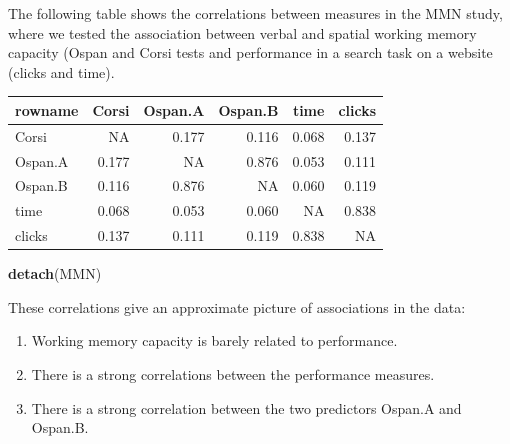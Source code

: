 \documentclass[]{svmono}
\newenvironment{Shaded}{\begin{snugshade}}{\end{snugshade}}
\newcommand{\KeywordTok}[1]{\textcolor[rgb]{0.13,0.29,0.53}{\textbf{#1}}}
\newcommand{\DecValTok}[1]{\textcolor[rgb]{0.00,0.00,0.81}{#1}}
\newcommand{\StringTok}[1]{\textcolor[rgb]{0.31,0.60,0.02}{#1}}
\newcommand{\OperatorTok}[1]{\textcolor[rgb]{0.81,0.36,0.00}{\textbf{#1}}}
\newcommand{\NormalTok}[1]{#1}
\providecommand{\tightlist}{%
  \setlength{\itemsep}{0pt}\setlength{\parskip}{0pt}}
\begin{document}
The following table shows the correlations between measures in the MMN
study, where we tested the association between verbal and spatial
working memory capacity (Ospan and Corsi tests and performance in a
search task on a website (clicks and time).

\begin{Shaded}
\end{Shaded}

\begin{tabular}{l|r|r|r|r|r}
\hline
rowname & Corsi & Ospan.A & Ospan.B & time & clicks\\
\hline
Corsi & NA & 0.177 & 0.116 & 0.068 & 0.137\\
\hline
Ospan.A & 0.177 & NA & 0.876 & 0.053 & 0.111\\
\hline
Ospan.B & 0.116 & 0.876 & NA & 0.060 & 0.119\\
\hline
time & 0.068 & 0.053 & 0.060 & NA & 0.838\\
\hline
clicks & 0.137 & 0.111 & 0.119 & 0.838 & NA\\
\hline
\end{tabular}

\begin{Shaded}
\begin{Highlighting}[]
\KeywordTok{detach}\NormalTok{(MMN)}
\end{Highlighting}
\end{Shaded}

These correlations give an approximate picture of associations in the
data:

\begin{enumerate}
\def\labelenumi{\arabic{enumi}.}
\tightlist
\item
  Working memory capacity is barely related to performance.
\item
  There is a strong correlations between the performance measures.
\item
  There is a strong correlation between the two predictors Ospan.A and
  Ospan.B.
\end{enumerate}
\end{document}
